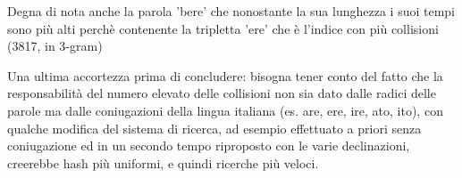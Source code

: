 \documentclass{article}
\begin{document}
\smallskip Degna di nota anche la parola 'bere' che nonostante la sua lunghezza i suoi tempi sono più alti perchè contenente la tripletta 'ere' che è l'indice con più collisioni (3817, in 3-gram)
\bigskip

Una ultima accortezza prima di concludere: bisogna tener conto del fatto che la responsabilità del numero elevato delle collisioni non sia dato dalle radici delle parole ma dalle coniugazioni della lingua italiana (es. are, ere, ire, ato, ito), con qualche modifica del sistema di ricerca, ad esempio effettuato a priori senza coniugazione ed in un secondo tempo riproposto con le varie declinazioni, creerebbe hash più uniformi, e quindi ricerche più veloci.
\end{document}

